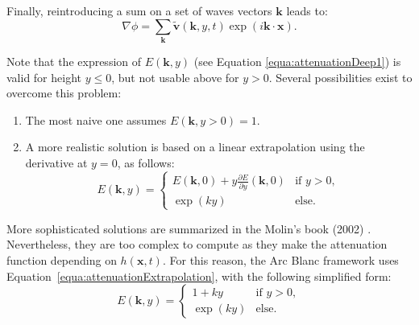 \documentclass[final]{jcgt}
\def\framework{the Arc Blanc framework\xspace}
\begin{document}
Finally, reintroducing a sum on a set of waves vectors $\mathbf{k}$ leads to:
\begin{equation}
	\nabla \phi =
	\sum_{\mathbf{k}}\tilde{\mathbf{v}}(\mathbf{k}, y, t)\exp\left(i\mathbf{k}\cdot\mathbf{x}\right).
\end{equation}

Note that the expression of $E\left(\mathbf{k},y\right)$ (see Equation \ref{equa:attenuationDeep1}) is valid for height $y\leq0$, but not usable above for $y>0$.
Several possibilities exist to overcome this problem:
\begin{enumerate}
	\item The most naive one assumes $E(\mathbf k,y>0)=1$.
	\item A more realistic solution is based on a linear extrapolation using the derivative at $y=0$, as follows:
	      \begin{equation}
		      \label{equa:attenuationExtrapolation}
		      E(\mathbf{k}, y)=
		      \begin{cases}
			      E(\mathbf k,0)+y\frac{\partial E}{\partial y}(\mathbf k,0) & \text{if~}y>0, \\
			      \exp(ky)                                                   & \text{else.}
		      \end{cases}
	      \end{equation}
\end{enumerate}

More sophisticated solutions are summarized in the Molin's book (2002) \cite{molinHydrodynamiqueStructuresOffshore2002}.
Nevertheless, they are too complex to compute as they make the attenuation function depending on $h(\mathbf x,t)$.
For this reason, \framework uses Equation~\ref{equa:attenuationExtrapolation}, with the following simplified form:
\begin{equation}
	\label{equa:attenuationFull}
	E(\mathbf{k}, y)=
	\begin{cases}
		1+ky     & \text{if~}y>0, \\
		\exp(ky) & \text{else.}
	\end{cases}
\end{equation}



\end{document}
